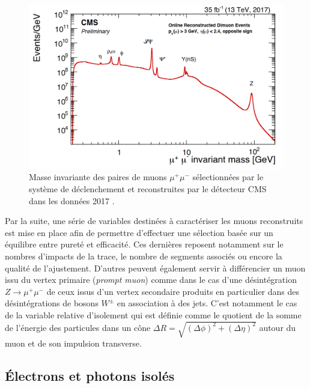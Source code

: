 \begin{figure}
\centering
    \includegraphics[width=0.8\linewidth]{Chapitre4/Images/dimuon.png} 
    \caption{Masse invariante des paires de muons $\mu^+\mu^-$ sélectionnées par le système de déclenchement et reconstruites par le détecteur CMS dans les données 2017 \cite{Dimuon}.}
    \label{dimuon}
\end{figure} 

Par la suite, une série de variables destinées à caractériser les muons reconstruits est mise en place afin de permettre d'effectuer une sélection basée sur un équilibre entre pureté et efficacité. Ces dernières reposent notamment sur le nombres d'impacts de la trace, le nombre de segments associés ou encore la qualité de l'ajustement. D'autres peuvent également servir à différencier un muon issu du vertex primaire (\textit{prompt muon}) comme dans le cas d'une désintégration $Z\rightarrow\mu^+\mu^-$ de ceux issus d'un vertex secondaire produits en particulier dans des désintégrations de bosons $W^{\pm}$ en association à des jets. C'est notamment le cas de la variable relative d'isolement qui est définie comme le quotient de la somme de l'énergie des particules dans un cône $\Delta R=\sqrt{(\Delta\phi)^2+(\Delta\eta)^2}$ autour du muon et de son impulsion transverse.

\subsection{Électrons et photons isolés}
\label{EGammaID}

